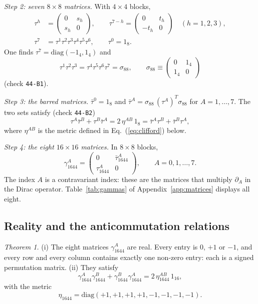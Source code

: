 \emph{Step 2: seven $8\times8$ matrices.} With $4\times4$ blocks,
\begin{align}
\tau^h&=\begin{pmatrix}0&s_h\\ s_h&0\end{pmatrix},\qquad
\tau^{7-h}=\begin{pmatrix}0&t_h\\ -t_h&0\end{pmatrix}\quad(h=1,2,3),\nonumber\\
\tau^7&=\tau^1\tau^2\tau^3\tau^4\tau^5\tau^6,\qquad\tau^0=1_8 .
\label{eq:tau}
\end{align}
One finds $\tau^7=\mathrm{diag}(-1_4,1_4)$ and
\begin{equation}
\tau^1\tau^2\tau^3=\tau^4\tau^5\tau^6\tau^7=\sigma_{88},\qquad
\sigma_{88}\equiv\begin{pmatrix}0&1_4\\ 1_4&0\end{pmatrix}
\label{eq:sigma88}
\end{equation}
(check \texttt{44-B1}).

\emph{Step 3: the barred matrices.} $\bar\tau^0=1_8$ and
$\bar\tau^A=\sigma_{88}\,(\tau^A)^{T}\sigma_{88}$ for $A=1,\dots,7$. The two sets satisfy
(check \texttt{44-B2})
\begin{equation}
\tau^A\bar\tau^B+\tau^B\bar\tau^A=2\,\eta^{AB}\,1_8=\bar\tau^A\tau^B+\bar\tau^B\tau^A,
\label{eq:taubar}
\end{equation}
where $\eta^{AB}$ is the metric defined in Eq.~(\ref{eq:clifford}) below.

\emph{Step 4: the eight $16\times16$ matrices.} In $8\times8$ blocks,
\begin{equation}
\gamma_{1644}^A=\begin{pmatrix}0&\bar\tau_{1644}^A\\ \tau_{1644}^A&0\end{pmatrix},\qquad A=0,1,\dots,7 .
\label{eq:gamma}
\end{equation}
The index $A$ is a contravariant index: these are the matrices that multiply $\partial_A$ in the Dirac
operator. Table~\ref{tab:gammas} of Appendix~\ref{app:matrices} displays all eight.

\subsection{Reality and the anticommutation relations}

\emph{Theorem 1.} (i) The eight matrices $\gamma_{1644}^A$ are real. Every entry is $0$, $+1$ or $-1$,
and every row and every column contains exactly one non-zero entry: each is a signed permutation
matrix. (ii) They satisfy
\begin{equation}
\gamma_{1644}^A\gamma_{1644}^B+\gamma_{1644}^B\gamma_{1644}^A=2\,\eta_{1644}^{AB}\,1_{16},
\label{eq:clifford}
\end{equation}
with the metric
\begin{equation}
\eta_{1644}=\mathrm{diag}(+1,+1,+1,+1,-1,-1,-1,-1).
\label{eq:eta}
\end{equation}

